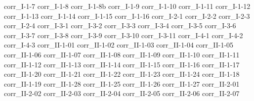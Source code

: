 {corr_I-1-7}
{corr_I-1-8}
{corr_I-1-8b}
{corr_I-1-9}
{corr_I-1-10}
{corr_I-1-11}
{corr_I-1-12}
{corr_I-1-13}
{corr_I-1-14}
{corr_I-1-15}
{corr_I-1-16}
{corr_I-2-1}
{corr_I-2-2}
{corr_I-2-3}
{corr_I-2-4}
{corr_I-3-1}
{corr_I-3-2}
{corr_I-3-3}
{corr_I-3-4}
{corr_I-3-5}
{corr_I-3-6}
{corr_I-3-7}
{corr_I-3-8}
{corr_I-3-9}
{corr_I-3-10}
{corr_I-3-11}
{corr_I-4-1}
{corr_I-4-2}
{corr_I-4-3}
{corr_II-1-01}
{corr_II-1-02}
{corr_II-1-03}
{corr_II-1-04}
{corr_II-1-05}
{corr_II-1-06}
{corr_II-1-07}
{corr_II-1-08}
{corr_II-1-09}
{corr_II-1-10}
{corr_II-1-11}
{corr_II-1-12}
{corr_II-1-13}
{corr_II-1-14}
{corr_II-1-15}
{corr_II-1-16}
{corr_II-1-17}
{corr_II-1-20}
{corr_II-1-21}
{corr_II-1-22}
{corr_II-1-23}
{corr_II-1-24}
{corr_II-1-18}
{corr_II-1-19}
{corr_II-1-28}
{corr_II-1-25}
{corr_II-1-26}
{corr_II-1-27}
{corr_II-2-01}
{corr_II-2-02}
{corr_II-2-03}
{corr_II-2-04}
{corr_II-2-05}
{corr_II-2-06}
{corr_II-2-07}
